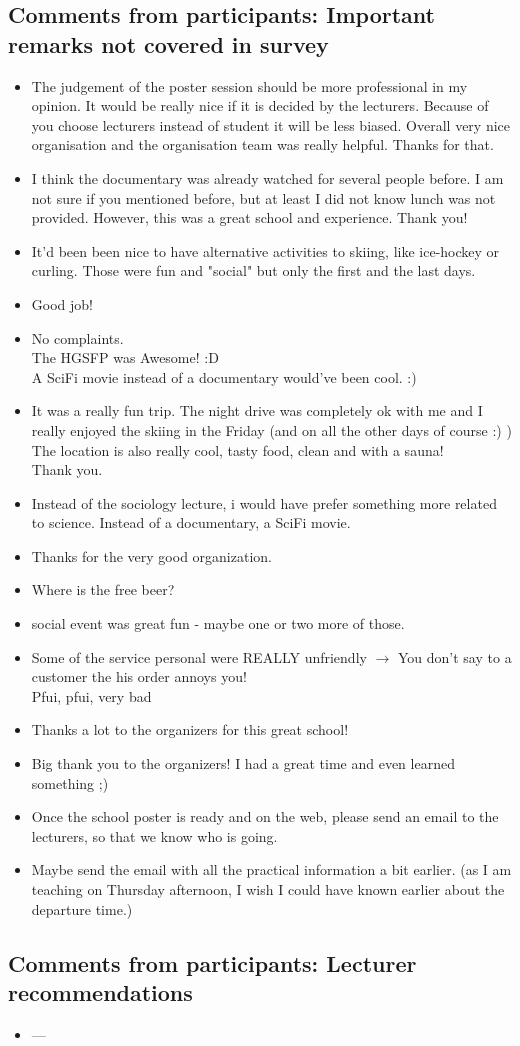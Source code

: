 \documentclass[11pt,a4paper]{article}
\numberwithin{equation}{section}
\numberwithin{table}{section}\setlength{\multlinegap}{25pt}
\begin{document}
\subsection{Comments from participants: Important remarks not covered in survey}
\begin{itemize}
\item The judgement of the poster session should be more professional in my opinion. It would be really nice if it is decided by the lecturers. Because of you choose lecturers instead of student it will be less biased. Overall very nice organisation and the organisation team was really helpful. Thanks for that.
\item I think the documentary was already watched for several people before. I am not sure if you mentioned before, but at least I did not know lunch was not provided. However, this was a great school and experience. Thank you!
\item It'd been been nice to have alternative activities to skiing, like ice-hockey or curling. Those were fun and "social" but only the first and the last days.
\item Good job!
\item No complaints.\\ The HGSFP was Awesome! :D\\ A SciFi movie instead of a documentary would've been cool. :)
\item It was a really fun trip. The night drive was completely ok with me and I really enjoyed the skiing in the Friday (and on all the other days of course :) ) The location is also really cool, tasty food, clean and with a sauna!\\ Thank you.
\item Instead of the sociology lecture, i would have prefer something more related to science. Instead of a documentary, a SciFi movie.
\item Thanks for the very good organization.
\item Where is the free beer?
\item social event was great fun - maybe one or two more of those.
\item Some of the service personal were REALLY unfriendly \(\rightarrow\) You don't say to a customer the his order annoys you!\\ Pfui, pfui, very bad
\item Thanks a lot to the organizers for this great school!
\item Big thank you to the organizers! I had a great time and even learned something ;)
\item Once the school poster is ready and on the web, please send an email to the lecturers, so that we know who is going.
\item Maybe send the email with all the practical information a bit earlier. (as I am teaching on Thursday afternoon, I wish I could have known earlier about the departure time.)
\end{itemize}

\subsection{Comments from participants: Lecturer recommendations}
\begin{itemize}
\item ---
\end{itemize}
\end{document}
